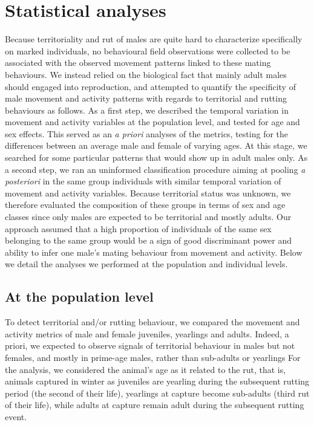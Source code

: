 \documentclass[a4paper,11pt]{article}
\begin{document}
\section*{Statistical analyses}

Because territoriality and rut of males are quite hard to characterize
specifically on marked individuals, no behavioural field observations
were collected to be associated with the observed movement patterns
linked to these mating behaviours. We instead relied on the biological
fact that mainly adult males should engaged into reproduction, and
attempted to quantify the specificity of male movement and activity
patterns with regards to territorial and rutting behaviours as
follows. As a first step, we described the temporal variation in
movement and activity variables at the population level, and tested
for age and sex effects. This served as an \textit{a priori} analyses
of the metrics, testing for the differences between an average male
and female of varying ages. At this stage, we searched for some
particular patterns that would show up in adult males only. As a
second step, we ran an uninformed classification procedure aiming at
pooling \textit{a posteriori} in the same group individuals with
similar temporal variation of movement and activity variables. Because
territorial status was unknown, we therefore evaluated the composition
of these groups in terms of sex and age classes since only males are
expected to be territorial and mostly adults. Our approach assumed
that a high proportion of individuals of the same sex belonging to the
same group would be a sign of good discriminant power and ability to
infer one male's mating behaviour from movement and activity. Below we
detail the analyses we performed at the population and individual
levels.

\subsection*{At the population level}
To detect territorial and/or rutting behaviour, we compared the
movement and activity metrics of male and female juveniles, yearlings
and adults. Indeed, a priori, we expected to observe signals of
territorial behaviour in males but not females, and mostly in
prime-age males, rather than sub-adults or yearlings For the analysis,
we considered the animal’s age as it related to the rut, that is,
animals captured in winter as juveniles are yearling during the
subsequent rutting period (the second of their life), yearlings at
capture become sub-adults (third rut of their life), while adults at
capture remain adult during the subsequent rutting event.
\end{document}
